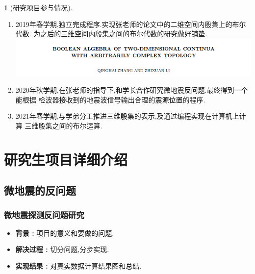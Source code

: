 \documentclass[UTF8]{ctexbeamer}	%
\theoremstyle{plain}
\theoremstyle{definition}
\newtheorem{emt}{}[section]
\theoremstyle{remark}
\numberwithin{equation}{section}
\begin{document}
\begin{frame}[fragile]
   \begin{emt} [研究项目参与情况]
    \begin{enumerate}
        \item 2019年春学期,独立完成程序.实现张老师的论文中的二维空间内殷集上的布尔代数.
        为之后的三维空间内殷集之间的布尔代数的研究做好铺垫.
        \includegraphics[width = \linewidth]{fig/articlename1.png}
        \item 2020年秋学期,在张老师的指导下,和学长合作研究微地震反问题.最终得到一个能根据
        检波器接收到的地震波信号输出合理的震源位置的程序.
        \item 2021年春学期,与学弟分工推进三维殷集的表示,及通过编程实现在计算机上计算
        三维殷集之间的布尔运算.
    \end{enumerate}
   \end{emt}
\end{frame}

\section{研究生项目详细介绍}
\subsection{微地震的反问题}

\begin{frame}
    \frametitle{微地震探测反问题研究}
    \begin{itemize}
        \setlength{\itemsep}{30pt}
        \item \textbf{背景 : } 项目的意义和要做的问题.
        \item  \textbf{解决过程 : } 切分问题,分步实现.
        \item \textbf{实现结果 : } 对真实数据计算结果图和总结.
    \end{itemize}
\end{frame}
\end{document}
